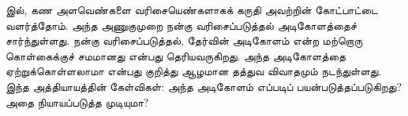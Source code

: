 \documentclass[../../../include/open-logic-section]{subfiles}
\begin{document}


 இல்,
கண அளவெண்களை வரிசையெண்களாகக் கருதி அவற்றின் கோட்பாட்டை
வளர்த்தோம். அந்த அணுகுமுறை நன்கு வரிசைப்படுத்தல் அடிகோளத்தைச்
சார்ந்துள்ளது. நன்கு வரிசைப்படுத்தல், தேர்வின் அடிகோளம் என்ற
மற்றொரு கொள்கைக்குச் சமமானது என்பது தெரியவருகிறது. அந்த
அடிகோளத்தை ஏற்றுக்கொள்ளலாமா என்பது குறித்து ஆழமான தத்துவ
விவாதமும் நடந்துள்ளது. இந்த அத்தியாயத்தின் கேள்விகள்: அந்த
அடிகோளம் எப்படிப் பயன்படுத்தப்படுகிறது? அதை நியாயப்படுத்த
முடியுமா?
\end{document}
